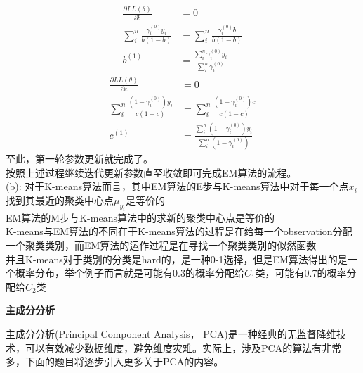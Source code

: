 \documentclass[answers]{exam}  %
\begin{document}
\begin{questions}
\begin{solution}
\begin{parts}
\begin{align*}
					\frac{\partial LL(\theta)}{\partial b} &= 0\\
					\sum_{i}^n \frac{\gamma_i^{(0)}  y_i}{b(1-b)} &= 	\sum_{i}^n \frac{\gamma_i^{(0)}  b}{b(1-b)} \\
					b^{(1)} &= \frac{\sum_{i}^n \gamma_i^{(0)}  y_i}{\sum_{i}^n \gamma_i^{(0)} }
				\end{align*}
				\begin{align*}
					\frac{\partial LL(\theta)}{\partial c} &= 0\\
					\sum_{i}^n \frac{(1-\gamma_i^{(0)} ) y_i}{c(1-c)} &= 	\sum_{i}^n \frac{(1-\gamma_i^{(0)} ) c}{c(1-c)} \\
					c^{(1)} &= \frac{\sum_{i}^n (1-\gamma_i^{(0)} ) y_i}{\sum_{i}^n (1-\gamma_i^{(0)} )}
				\end{align*}
				至此，第一轮参数更新就完成了。\\
				按照上述过程继续迭代更新参数直至收敛即可完成EM算法的流程。\\
			  (b):
			  对于K-means算法而言，其中EM算法的E步与K-means算法中对于每一个点$x_i$找到其最近的聚类中心点$\mu_{y_i}$是等价的\\
			  EM算法的M步与K-means算法中的求新的聚类中心点是等价的\\
			  K-means与EM算法的不同在于K-means算法的过程是在给每一个observation分配一个聚类类别，而EM算法的运作过程是在寻找一个聚类类别的似然函数\\
			  并且K-means对于类别的分类是hard的，是一种0-1选择，但是EM算法得出的是一个概率分布，举个例子而言就是可能有0.3的概率分配给$C_1$类，可能有0.7的概率分配给$C_2$类\\
	\end{parts}
\end{solution}


\question [25] \textbf{主成分分析}

主成分分析(Principal Component Analysis， PCA)是一种经典的无监督降维技术，可以有效减少数据维度，避免维度灾难。实际上，涉及PCA的算法有非常多，下面的题目将逐步引入更多关于PCA的内容。

\end{questions}
\end{document}
